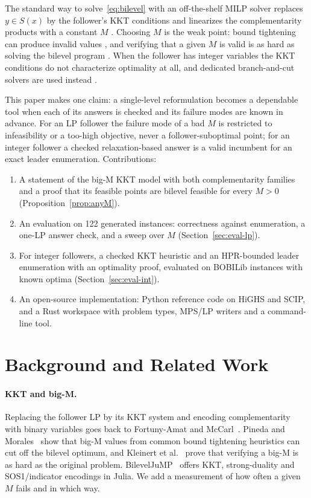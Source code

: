\documentclass[11pt]{article}
\begin{document}
The standard way to solve~\eqref{eq:bilevel} with an off-the-shelf MILP solver
replaces $y \in S(x)$ by the follower's KKT conditions and linearizes the
complementarity products with a constant $M$
\cite{fortuny1981representation}. Choosing $M$ is the weak point: bound
tightening can produce invalid values \cite{pineda2019solving}, and verifying
that a given $M$ is valid is as hard as solving the bilevel program
\cite{kleinert2020nofreelunch}. When the follower has integer variables the KKT
conditions do not characterize optimality at all, and dedicated
branch-and-cut solvers are used instead
\cite{denegre2009branch, fischetti2017new, tahernejad2020branch}.

This paper makes one claim: a single-level reformulation becomes a dependable
tool when each of its answers is checked and its failure modes are known in
advance. For an LP follower the failure mode of a bad $M$ is restricted to
infeasibility or a too-high objective, never a follower-suboptimal point; for
an integer follower a checked relaxation-based answer is a valid incumbent
for an exact leader enumeration. Contributions:
\begin{enumerate}
\item A statement of the big-M KKT model with both complementarity families
  and a proof that its feasible points are bilevel feasible for every $M>0$
  (Proposition~\ref{prop:anyM}).
\item An evaluation on 122 generated instances: correctness against
  enumeration, a one-LP answer check, and a sweep over $M$
  (Section~\ref{sec:eval-lp}).
\item For integer followers, a checked KKT heuristic and an HPR-bounded
  leader enumeration with an optimality proof, evaluated on BOBILib instances
  with known optima (Section~\ref{sec:eval-int}).
\item An open-source implementation: Python reference code on HiGHS and SCIP,
  and a Rust workspace with problem types, MPS/LP writers and a command-line
  tool.
\end{enumerate}

\section{Background and Related Work}
\label{sec:related}

\paragraph{KKT and big-M.} Replacing the follower LP by its KKT system and
encoding complementarity with binary variables goes back to Fortuny-Amat and
McCarl~\cite{fortuny1981representation}. Pineda and
Morales~\cite{pineda2019solving} show that big-M values from common bound
tightening heuristics can cut off the bilevel optimum, and Kleinert et
al.~\cite{kleinert2020nofreelunch} prove that verifying a big-M is as hard as
the original problem. BilevelJuMP~\cite{diasgarcia2024bileveljump} offers
KKT, strong-duality and SOS1/indicator encodings in Julia. We add a
measurement of how often a given $M$ fails and in which way.
\end{document}
